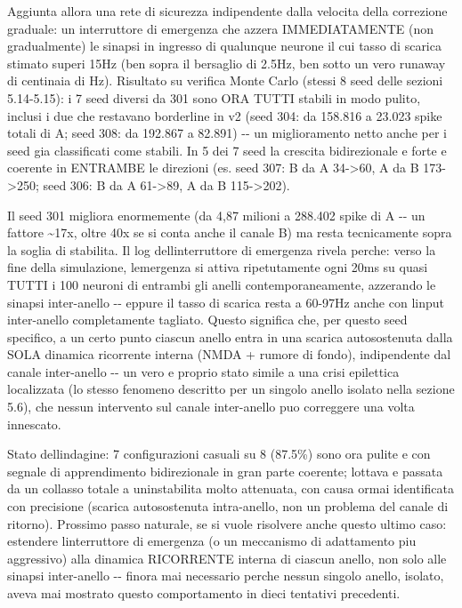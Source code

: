 \documentclass[
  italian,
]{article}
\begin{document}
Aggiunta allora una rete di sicurezza indipendente dalla velocita\textquotesingle{} della correzione graduale: un interruttore di emergenza che azzera IMMEDIATAMENTE (non gradualmente) le sinapsi in ingresso di qualunque neurone il cui tasso di scarica stimato superi 15Hz (ben sopra il bersaglio di 2.5Hz, ben sotto un vero runaway di centinaia di Hz). Risultato su verifica Monte Carlo (stessi 8 seed delle sezioni 5.14-5.15): i 7 seed diversi da 301 sono ORA TUTTI stabili in modo pulito, inclusi i due che restavano borderline in v2 (seed 304: da 158.816 a 23.023 spike totali di A; seed 308: da 192.867 a 82.891) -\/- un miglioramento netto anche per i seed gia\textquotesingle{} classificati come stabili. In 5 dei 7 seed la crescita bidirezionale e\textquotesingle{} forte e coerente in ENTRAMBE le direzioni (es. seed 307: B da A 34-\textgreater60, A da B 173-\textgreater250; seed 306: B da A 61-\textgreater89, A da B 115-\textgreater202).

Il seed 301 migliora enormemente (da 4,87 milioni a 288.402 spike di A -\/- un fattore \textasciitilde17x, oltre 40x se si conta anche il canale B) ma resta tecnicamente sopra la soglia di stabilita\textquotesingle. Il log dell\textquotesingle interruttore di emergenza rivela perche\textquotesingle: verso la fine della simulazione, l\textquotesingle emergenza si attiva ripetutamente ogni 20ms su quasi TUTTI i 100 neuroni di entrambi gli anelli contemporaneamente, azzerando le sinapsi inter-anello -\/- eppure il tasso di scarica resta a 60-97Hz anche con l\textquotesingle input inter-anello completamente tagliato. Questo significa che, per questo seed specifico, a un certo punto ciascun anello entra in una scarica autosostenuta dalla SOLA dinamica ricorrente interna (NMDA + rumore di fondo), indipendente dal canale inter-anello -\/- un vero e proprio stato simile a una crisi epilettica localizzata (lo stesso fenomeno descritto per un singolo anello isolato nella sezione 5.6), che nessun intervento sul canale inter-anello puo\textquotesingle{} correggere una volta innescato.

Stato dell\textquotesingle indagine: 7 configurazioni casuali su 8 (87.5\%) sono ora pulite e con segnale di apprendimento bidirezionale in gran parte coerente; l\textquotesingle ottava e\textquotesingle{} passata da un collasso totale a un\textquotesingle instabilita\textquotesingle{} molto attenuata, con causa ormai identificata con precisione (scarica autosostenuta intra-anello, non un problema del canale di ritorno). Prossimo passo naturale, se si vuole risolvere anche questo ultimo caso: estendere l\textquotesingle interruttore di emergenza (o un meccanismo di adattamento piu\textquotesingle{} aggressivo) alla dinamica RICORRENTE interna di ciascun anello, non solo alle sinapsi inter-anello -\/- finora mai necessario perche\textquotesingle{} nessun singolo anello, isolato, aveva mai mostrato questo comportamento in dieci tentativi precedenti.
\end{document}
